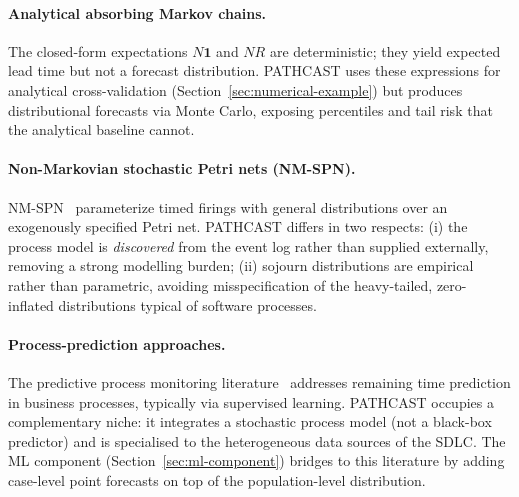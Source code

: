 \paragraph{Analytical absorbing Markov chains.}
The closed-form expectations $N\mathbf{1}$ and $NR$ are
deterministic; they yield expected lead time but not a forecast
distribution. PATHCAST uses these expressions for analytical
cross-validation (Section~\ref{sec:numerical-example}) but produces
distributional forecasts via Monte Carlo, exposing percentiles and tail
risk that the analytical baseline cannot.

\paragraph{Non-Markovian stochastic Petri nets (NM-SPN).}
NM-SPN~\cite{RoggeSolti2015NonMarkovianSPN} parameterize timed firings
with general distributions over an exogenously specified Petri net.
PATHCAST differs in two respects: (i) the process model is
\emph{discovered} from the event log rather than supplied externally,
removing a strong modelling burden; (ii) sojourn distributions are
empirical rather than parametric, avoiding misspecification of the
heavy-tailed, zero-inflated distributions typical of software
processes.

\paragraph{Process-prediction approaches.}
The predictive process monitoring
literature~\cite{polato2018time, verenich2019survey} addresses remaining
time prediction in business processes, typically via supervised
learning. PATHCAST occupies a complementary niche: it integrates a
stochastic process model (not a black-box predictor) and is specialised
to the heterogeneous data sources of the SDLC. The ML component
(Section~\ref{sec:ml-component}) bridges to this literature by adding
case-level point forecasts on top of the population-level distribution.
